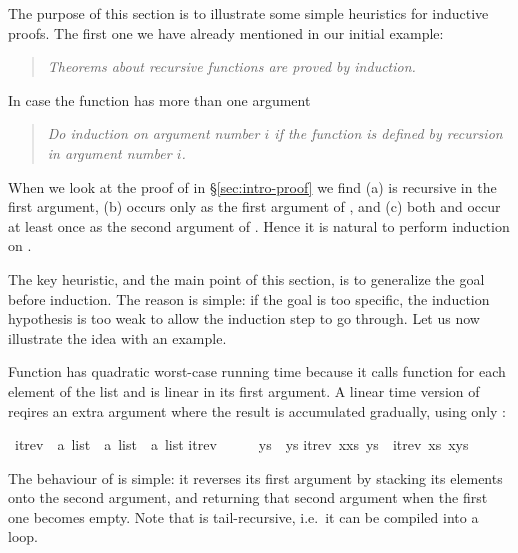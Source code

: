 %
\begin{isabellebody}%
%
%
\begin{isamarkuptext}%
\label{sec:InductionHeuristics}
The purpose of this section is to illustrate some simple heuristics for
inductive proofs. The first one we have already mentioned in our initial
example:
\begin{quote}
\emph{Theorems about recursive functions are proved by induction.}
\end{quote}
In case the function has more than one argument
\begin{quote}
\emph{Do induction on argument number $i$ if the function is defined by
recursion in argument number $i$.}
\end{quote}
When we look at the proof of 
in \S\ref{sec:intro-proof} we find (a) \isa{{\isacharat}} is recursive in
the first argument, (b)  occurs only as the first argument of
\isa{{\isacharat}}, and (c) both  and  occur at least once as
the second argument of \isa{{\isacharat}}. Hence it is natural to perform induction
on .

The key heuristic, and the main point of this section, is to
generalize the goal before induction. The reason is simple: if the goal is
too specific, the induction hypothesis is too weak to allow the induction
step to go through. Let us now illustrate the idea with an example.

Function  has quadratic worst-case running time
because it calls function \isa{{\isacharat}} for each element of the list and
\isa{{\isacharat}} is linear in its first argument.  A linear time version of
 reqires an extra argument where the result is accumulated
gradually, using only \isa{{\isacharhash}}:%
\end{isamarkuptext}%
\ itrev\ {\isacharcolon}{\isacharcolon}\ {\isachardoublequote}{\isacharprime}a\ list\ {\isasymRightarrow}\ {\isacharprime}a\ list\ {\isasymRightarrow}\ {\isacharprime}a\ list{\isachardoublequote}\isanewline
{}\isanewline
{\isachardoublequote}itrev\ {\isacharbrackleft}{\isacharbrackright}\ \ \ \ \ ys\ {\isacharequal}\ ys{\isachardoublequote}\isanewline
{\isachardoublequote}itrev\ {\isacharparenleft}x{\isacharhash}xs{\isacharparenright}\ ys\ {\isacharequal}\ itrev\ xs\ {\isacharparenleft}x{\isacharhash}ys{\isacharparenright}{\isachardoublequote}%
\begin{isamarkuptext}%
\noindent
The behaviour of  is simple: it reverses
its first argument by stacking its elements onto the second argument,
and returning that second argument when the first one becomes
empty. Note that  is tail-recursive, i.e.\ it can be
compiled into a loop.


\end{isamarkuptext}
\end{isabellebody}
